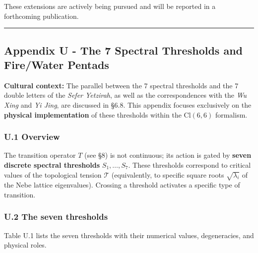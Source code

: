 \documentclass[11pt]{article}
\let\oldmathcal\mathcal
\renewcommand{\mathcal}[1]{\oldmathcal{#1}}
\begin{document}
These extensions are actively being pursued and will be reported in a
forthcoming publication.

\begin{center}\rule{0.5\linewidth}{0.5pt}\end{center}

\hypertarget{appendix-u---the-7-spectral-thresholds-and-firewater-pentads}{%
\subsection{Appendix U - The 7 Spectral Thresholds and Fire/Water
Pentads}\label{appendix-u---the-7-spectral-thresholds-and-firewater-pentads}}

\textbf{Cultural context:} The parallel between the 7 spectral
thresholds and the 7 double letters of the \emph{Sefer Yetzirah}, as
well as the correspondences with the \emph{Wu Xing} and \emph{Yi Jing},
are discussed in §6.8. This appendix focuses exclusively on the
\textbf{physical implementation} of these thresholds within the
\(\text{Cl}(6,6)\) formalism.

\hypertarget{u.1-overview}{%
\subsubsection{U.1 Overview}\label{u.1-overview}}

The transition operator \(T\) (see §8) is not continuous; its action is
gated by \textbf{seven discrete spectral thresholds} \(S_1,\ldots,S_7\).
These thresholds correspond to critical values of the topological
tension \(\mathcal{T}\) (equivalently, to specific square roots
\(\sqrt{\lambda_i}\) of the Nebe lattice eigenvalues). Crossing a
threshold activates a specific type of transition.

\hypertarget{u.2-the-seven-thresholds}{%
\subsubsection{U.2 The seven
thresholds}\label{u.2-the-seven-thresholds}}

Table U.1 lists the seven thresholds with their numerical values,
degeneracies, and physical roles.
\end{document}
